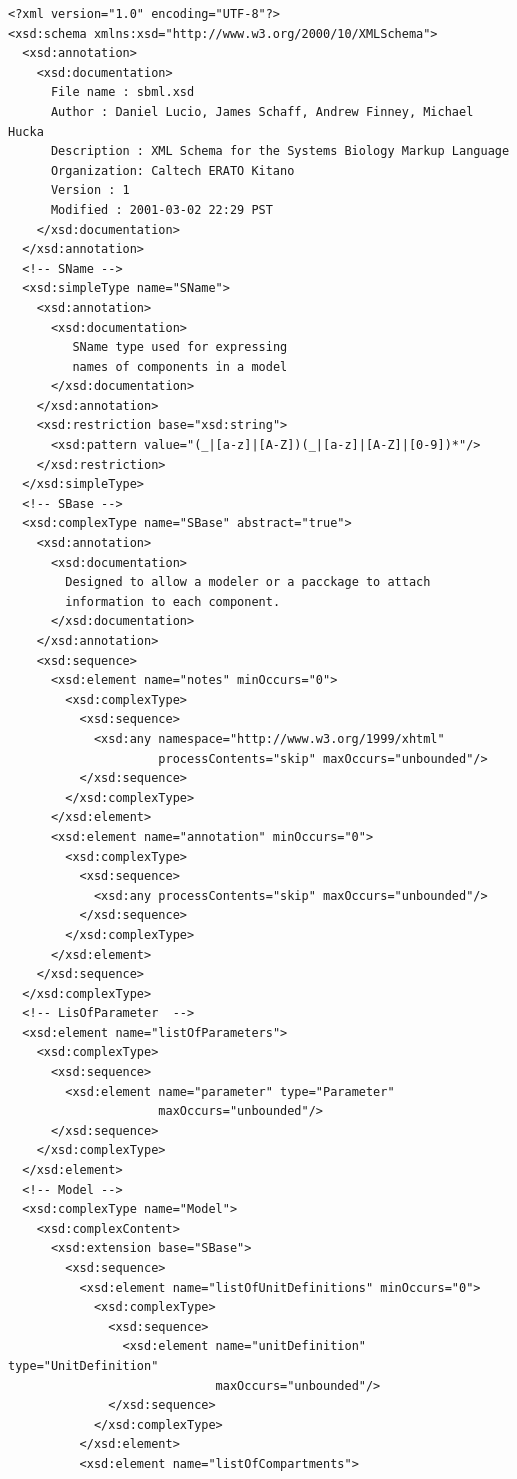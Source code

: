 \documentclass[10pt]{cekarticle}
\begin{document}
\begin{small}
\tightspacing
\begin{verbatim}
<?xml version="1.0" encoding="UTF-8"?>
<xsd:schema xmlns:xsd="http://www.w3.org/2000/10/XMLSchema">
  <xsd:annotation>
    <xsd:documentation> 
      File name : sbml.xsd
      Author : Daniel Lucio, James Schaff, Andrew Finney, Michael Hucka
      Description : XML Schema for the Systems Biology Markup Language
      Organization: Caltech ERATO Kitano
      Version : 1
      Modified : 2001-03-02 22:29 PST
    </xsd:documentation>
  </xsd:annotation>
  <!-- SName -->
  <xsd:simpleType name="SName">
    <xsd:annotation>
      <xsd:documentation>
         SName type used for expressing
         names of components in a model
      </xsd:documentation>
    </xsd:annotation>
    <xsd:restriction base="xsd:string">
      <xsd:pattern value="(_|[a-z]|[A-Z])(_|[a-z]|[A-Z]|[0-9])*"/>
    </xsd:restriction>
  </xsd:simpleType>
  <!-- SBase -->
  <xsd:complexType name="SBase" abstract="true">
    <xsd:annotation>
      <xsd:documentation>
        Designed to allow a modeler or a pacckage to attach
        information to each component.
      </xsd:documentation>
    </xsd:annotation>
    <xsd:sequence>
      <xsd:element name="notes" minOccurs="0">
        <xsd:complexType>
          <xsd:sequence>
            <xsd:any namespace="http://www.w3.org/1999/xhtml"
                     processContents="skip" maxOccurs="unbounded"/>
          </xsd:sequence>
        </xsd:complexType>
      </xsd:element>
      <xsd:element name="annotation" minOccurs="0">
        <xsd:complexType>
          <xsd:sequence>
            <xsd:any processContents="skip" maxOccurs="unbounded"/>
          </xsd:sequence>
        </xsd:complexType>
      </xsd:element>
    </xsd:sequence>
  </xsd:complexType>
  <!-- LisOfParameter  -->
  <xsd:element name="listOfParameters">
    <xsd:complexType>
      <xsd:sequence>
        <xsd:element name="parameter" type="Parameter"
                     maxOccurs="unbounded"/>
      </xsd:sequence>
    </xsd:complexType>
  </xsd:element>
  <!-- Model -->
  <xsd:complexType name="Model">
    <xsd:complexContent>
      <xsd:extension base="SBase">
        <xsd:sequence>
          <xsd:element name="listOfUnitDefinitions" minOccurs="0">
            <xsd:complexType>
              <xsd:sequence>
                <xsd:element name="unitDefinition" type="UnitDefinition"
                             maxOccurs="unbounded"/>
              </xsd:sequence>
            </xsd:complexType>
          </xsd:element>
          <xsd:element name="listOfCompartments">

\end{verbatim}
\end{small}
\end{document}
